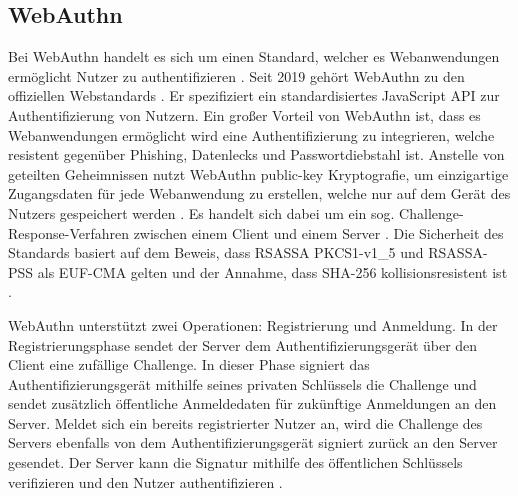 \subsection{WebAuthn}
Bei WebAuthn handelt es sich um einen Standard, welcher es Webanwendungen ermöglicht Nutzer zu authentifizieren \cite{lyastani2020fido2}. Seit 2019 gehört WebAuthn zu den offiziellen Webstandards \cite{farke2020you}. Er spezifiziert ein standardisiertes JavaScript \ac{API} zur Authentifizierung von Nutzern. Ein großer Vorteil von WebAuthn ist, dass es Webanwendungen ermöglicht wird eine Authentifizierung zu integrieren, welche resistent gegenüber Phishing, Datenlecks und Passwortdiebstahl ist. Anstelle von geteilten Geheimnissen nutzt WebAuthn public-key Kryptografie, um einzigartige Zugangsdaten für jede Webanwendung zu erstellen, welche nur auf dem Gerät des Nutzers gespeichert werden \cite{farke2020you}. Es handelt sich dabei um ein sog. Challenge-Response-Verfahren zwischen einem Client und einem Server \cite{barbosa2021provable}. Die Sicherheit des Standards basiert auf dem Beweis, dass RSASSA PKCS1-v1\_5 und RSASSA-PSS als \ac{EUF-CMA} gelten und der Annahme, dass SHA-256 kollisionsresistent ist \cite{barbosa2021provable}.

WebAuthn unterstützt zwei Operationen: Registrierung und Anmeldung. In der Registrierungsphase sendet der Server dem Authentifizierungsgerät über den Client eine zufällige Challenge. In dieser Phase signiert das Authentifizierungsgerät mithilfe seines privaten Schlüssels die Challenge und sendet zusätzlich öffentliche Anmeldedaten für zukünftige Anmeldungen an den Server. Meldet sich ein bereits registrierter Nutzer an, wird die Challenge des Servers ebenfalls von dem Authentifizierungsgerät signiert zurück an den Server gesendet. Der Server kann die Signatur mithilfe des öffentlichen Schlüssels verifizieren und den Nutzer authentifizieren \cite{barbosa2021provable}.

